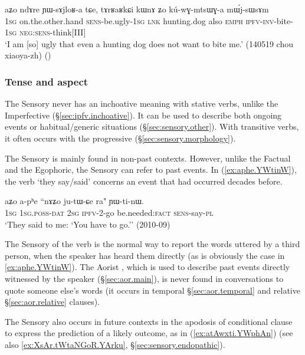 \begin{exe}
\ex \label{ex:YWsAjloRa}
\gll  aʑo ndɤre ɲɯ-sɤjloʁ-a tɕe, tɤrʁaʁkɕi kɯnɤ ʑo kú-wɣ-mtsɯɣ-a mɯ́j-sɯsɤm \\
\textsc{1sg} on.the.other.hand \textsc{sens}-be.ugly-\textsc{1sg} \textsc{lnk} hunting.dog also \textsc{emph} \textsc{ipfv}-\textsc{inv}-bite-\textsc{1sg} \textsc{neg}:\textsc{sens}-think[III] \\
\glt `I am [so] ugly that even a hunting dog does not want to bite me.'  (140519 chou xiaoya-zh)
()
\end{exe}

 
\subsubsection{Tense and aspect} \label{sec:sensory.functions}
The Sensory never has an inchoative meaning with stative verbs, unlike the Imperfective (§\ref{sec:ipfv.inchoative}). It can be used to describe both ongoing events or habitual/generic situations (§\ref{sec:sensory.other}).
With transitive verbs, it often occurs with the progressive (§\ref{sec:sensory.morphology}). 

The Sensory is mainly found in non-past contexts. However, unlike the Factual and the Egophoric, the Sensory can refer to past events. In (\ref{ex:aphe.YWtinW}), the verb  `they say/said' concerns an event that had occurred decades before.

\begin{exe}
\ex \label{ex:aphe.YWtinW}
\gll  aʑo a-pʰe ``nɤʑo ju-tɯ-ɕe ra" ɲɯ-ti-nɯ. \\
\textsc{1sg} \textsc{1sg}.\textsc{poss}-\textsc{dat} \textsc{2sg} \textsc{ipfv}-2-go be.needed:\textsc{fact} \textsc{sens}-say-\textsc{pl} \\
\glt  `They said to me: `You have to go.'' (2010-09)
\end{exe}

The Sensory  of the verb  is the normal way to report the words uttered by a third person, when the speaker has heard them directly (as is obviously the case in \ref{ex:aphe.YWtinW}). The Aorist , which is used to describe past events directly witnessed by the speaker (§\ref{sec:aor.main}), is never found in conversations to quote someone else's words (it occurs in temporal §\ref{sec:aor.temporal} and relative §\ref{sec:aor.relative} clauses).

The Sensory also occurs in future contexts in the apodosis of conditional clause to express the prediction of a likely outcome, as in (\ref{ex:atAwxti.YWphAn}) (see also \ref{ex:XsAr.tWtaNGoR.YArku}, §\ref{sec:sensory.endopathic}).

